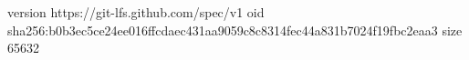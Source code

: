 version https://git-lfs.github.com/spec/v1
oid sha256:b0b3ec5ce24ee016ffcdaec431aa9059c8c8314fec44a831b7024f19fbc2eaa3
size 65632
